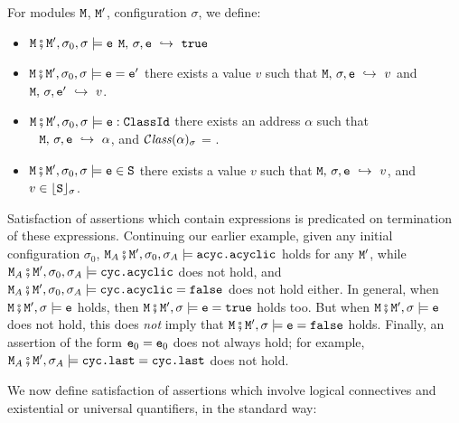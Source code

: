\begin{definition} For modules $\M$, $\M'$,  configuration $\sigma$,  we define$:$
\label{def:valid:assertion:basic}
\begin{itemize}
\item
$\M\mkpair \M', \sigma_0 ,\sigma \models\SE$ \IFF   $ \M,\,  \sigma, \SE \ \hookrightarrow\   \prg{true}$ 
\item
$\M\mkpair \M',\sigma_0 , \sigma \models\SE=\SEPrime$ \IFF there exists a value $v$ such that  $\M,\,  \sigma, \SE \ \hookrightarrow\   v$  and $ \M,\,  \sigma, \SEPrime \ \hookrightarrow\   v$.
           \item
$\M\mkpair \M',\sigma_0 , \sigma \models\SE:\prg{ClassId}$ \IFF there exists an address $\alpha$ such that \\
$\strut ~ $ \hspace{2in} \hfill   
 $ \M,\,  \sigma, \SE \ \hookrightarrow\   \alpha$, and $\ClassOf{\alpha}{\sigma}$ = .
\item
$\M\mkpair \M',\sigma_0 , \sigma \models \SE\in \prg{S}$ \IFF there exists a value $v$ such that 
 $ \M,\,  \sigma, \SE \ \hookrightarrow\   v$, and $v \in \interp{\prg{S}}{\sigma}$.
\end{itemize}
\end{definition}

Satisfaction of assertions which contain expressions is predicated on termination of these expressions.
Continuing our earlier example, given any initial configuration $\sigma_0$,  
$\M_A\mkpair \M', \sigma_0,\sigma_A \models \prg{acyc.acyclic}$ holds for any $\M'$, while $\M_A\mkpair \M', \sigma_0,\sigma_A \models \prg{cyc.acyclic}$
does not hold, and $\M_A\mkpair \M', \sigma_0,\sigma_A \models \prg{cyc.acyclic}=\prg{false}$ does not hold either.
In general, when $\M\mkpair \M', \sigma  \models \prg{e}$ holds,  then $\M\mkpair \M', \sigma  \models \prg{e}=\prg{true}$ holds too.
But when $\M\mkpair \M', \sigma  \models \prg{e}$ does not hold, this does \emph{not} imply that $\M\mkpair \M', \sigma  \models \prg{e}=\prg{false}$ holds.
Finally, an assertion of the form $\e_0=\e_0$ does not always hold; for example,   $\M_A\mkpair \M', \sigma_A \models \prg{cyc.last}=\prg{cyc.last}$ does not hold.

We now define satisfaction of assertions which involve logical connectives and existential or universal quantifiers, in the standard way:


